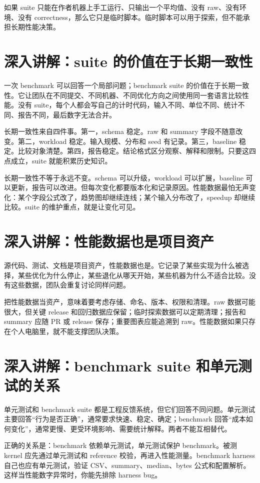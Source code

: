 如果 suite 只能在作者机器上手工运行、只输出一个平均值、没有 raw、没有环境、没有 correctness，那么它只是临时脚本。临时脚本可以用于探索，但不能承担长期性能决策。

\section{深入讲解：suite 的价值在于长期一致性}

一次 benchmark 可以回答一个局部问题；benchmark suite 的价值在于长期一致性。它让团队在不同提交、不同机器、不同优化方向之间使用同一套语言比较性能。没有 suite，每个人都会写自己的计时代码，输入不同、单位不同、统计不同、报告不同，最后数字无法合并。

长期一致性来自四件事。第一，schema 稳定。raw 和 summary 字段不随意改变。第二，workload 稳定。输入规模、分布和 seed 有记录。第三，baseline 稳定。比较对象清楚。第四，报告稳定。结论格式区分观察、解释和限制。只要这四点成立，suite 就能积累历史知识。

长期一致性不等于永远不变。schema 可以升级，workload 可以扩展，baseline 可以更新，报告可以改进。但每次变化都要版本化和记录原因。性能数据最怕无声变化：某个字段公式改了，趋势图却继续连线；某个输入分布改了，speedup 却继续比较。suite 的维护重点，就是让变化可见。

\section{深入讲解：性能数据也是项目资产}

源代码、测试、文档是项目资产，性能数据也是。它记录了某些实现为什么被选择，某些优化为什么停止，某些退化从哪天开始，某些机器为什么不适合比较。没有这些数据，团队会重复讨论同样问题。

把性能数据当资产，意味着要考虑存储、命名、版本、权限和清理。raw 数据可能很大，但关键 release 和回归数据应保留；临时探索数据可以定期清理；报告和 summary 应随 PR 或 release 保存；重要图表应能追溯到 raw。性能数据如果只存在个人电脑里，就不能支撑团队决策。

\section{深入讲解：benchmark suite 和单元测试的关系}

单元测试和 benchmark suite 都是工程反馈系统，但它们回答不同问题。单元测试主要回答“行为是否正确”，通常要求快速、稳定、确定；benchmark 回答“成本如何变化”，通常更慢、更受环境影响、需要统计解释。两者不能互相替代。

正确的关系是：benchmark 依赖单元测试，单元测试保护 benchmark。被测 kernel 应先通过单元测试和 reference 校验，再进入性能测量。benchmark harness 自己也应有单元测试，验证 CSV、summary、median、bytes 公式和配置解析。这样当性能数字异常时，你能先排除 harness bug。

